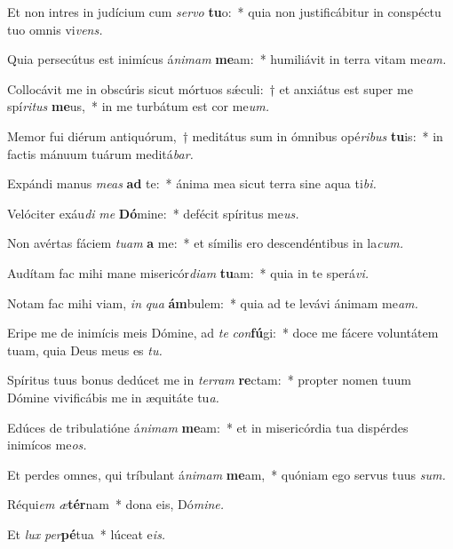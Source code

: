 \item Et non intres in judícium cum \textit{servo} \textbf{tu}o:~* quia non justificábitur in conspéctu tuo omnis vi\textit{vens.}
\item Quia persecútus est inimícus á\tinyhspace\textit{nimam} \textbf{me}am:~* humiliávit in terra vitam me\textit{am.}
\item Collocávit me in obscúris sicut mórtuos sǽculi:~† et anxiátus est super me spí\textit{ritus} \textbf{me}us,~* in me turbátum est cor me\textit{um.}
\item Memor fui diérum antiquórum,~† meditátus sum in ómnibus opé\tinyhspace\textit{ribus} \textbf{tu}is:~* in factis mánuum tuárum meditá\textit{bar.}
\item Expándi manus \textit{meas} \textbf{ad} te:~* ánima mea sicut terra sine aqua ti\textit{bi.}
\item Velóciter exáu\tinyhspace\textit{di} \textit{me} \textbf{Dó}mine:~* defécit spíritus me\textit{us.}
\item Non avértas fáciem \textit{tuam} \textbf{a} me:~* et símilis ero descendéntibus in la\textit{cum.}
\item Audítam fac mihi mane misericór\textit{diam} \textbf{tu}am:~* quia in te sperá\tinyhspace\textit{vi.}
\item Notam fac mihi viam, \textit{in} \textit{qua} \textbf{ám}bulem:~* quia ad te levávi ánimam me\tinyhspace\textit{am.}
\item Eripe me de inimícis meis Dómine, ad \textit{te} \textit{con}\textbf{fú}gi:~* doce me fácere voluntátem tuam, quia Deus meus es \textit{tu.}
\item Spíritus tuus bonus dedúcet me in \textit{terram} \textbf{re}ctam:~* propter nomen tuum Dómine vivificábis me in æquitáte tu\tinyhspace\textit{a.}
\item Edúces de tribulatióne á\tinyhspace\textit{nimam} \textbf{me}am:~* et in misericórdia tua dispérdes inimícos me\textit{os.}
\item Et perdes omnes, qui tríbulant á\textit{nimam} \textbf{me}am,~* quóniam ego servus tuus \textit{sum.}
\item Réqui\tinyhspace\textit{em} \textit{æ}\textbf{tér}nam~* dona eis, Dó\textit{mine.}
\item Et \textit{lux} \textit{per}\textbf{pé}tua~* lúceat e\tinyhspace\textit{is.}